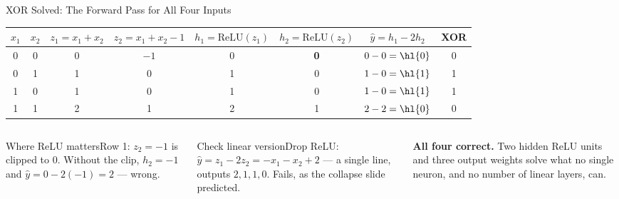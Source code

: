 \documentclass[aspectratio=169,10pt]{beamer}
\begin{document}
\begin{frame}{XOR Solved: The Forward Pass for All Four Inputs}
\centering\small\renewcommand{\arraystretch}{1.35}
\begin{tabular}{cc|cc|cc|c|c}
\toprule
$x_1$&$x_2$&$z_1=x_1+x_2$&$z_2=x_1+x_2-1$&$h_1=\text{ReLU}(z_1)$&$h_2=\text{ReLU}(z_2)$&$\hat y=h_1-2h_2$&XOR\\\midrule
0&0&0&$-1$&0&\textbf{0}&$0-0=\hl{0}$&0\\
0&1&1&0&1&0&$1-0=\hl{1}$&1\\
1&0&1&0&1&0&$1-0=\hl{1}$&1\\
1&1&2&1&2&1&$2-2=\hl{0}$&0\\\bottomrule
\end{tabular}
\vspace{6pt}

\raggedright
\begin{columns}[T]
\begin{cbox}{Where ReLU matters}\scriptsize Row 1: $z_2=-1$ is clipped to $0$. Without the clip, $h_2=-1$ and $\hat y=0-2(-1)=2$ --- wrong.\end{cbox}
\begin{cbox}{Check linear version}\scriptsize Drop ReLU: $\hat y=z_1-2z_2=-x_1-x_2+2$ --- a single line, outputs $2,1,1,0$. Fails, as the collapse slide predicted.\end{cbox}
\begin{rbox}\scriptsize\textbf{All four correct.} Two hidden ReLU units and three output weights solve what no single neuron, and no number of linear layers, can.\end{rbox}
\end{columns}
\end{frame}
\end{document}
